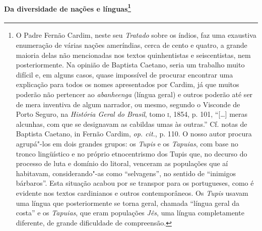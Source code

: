 \paragraph[Da diversidade de nações e línguas]{Da diversidade de nações e línguas\protect\footnote{ O
Padre Fernão Cardim, neste seu \textit{Tratado} sobre os índios, faz
uma exaustiva enumeração de várias nações ameríndias, cerca de cento e
quatro, a grande maioria delas não mencionadas nos textos quinhentistas
e seiscentistas, nem posteriormente. Na opinião de Baptista Caetano,
seria um trabalho muito difícil e, em alguns casos, quase impossível de
procurar encontrar uma explicação para todos os nomes apresentados por
Cardim, já que muitos poderão não pertencer ao \textit{abanheenga}
(língua geral) e outros poderão até ser de mera inventiva de algum
narrador, ou mesmo, segundo o Visconde de Porto Seguro, na
\textit{História Geral do Brasil}, tomo \textsc{i}, 1854, p. 101, ``[\ldots] meras
alcunhas, com que se designavam as cabildas umas às outras.'' Cf.
notas de Baptista Caetano, in Fernão Cardim, \textit{op. cit.}, p. 110.
O nosso autor procura agrupá"-los em dois grandes grupos: os
\textit{Tupis} e os \textit{Tapuias}, com base no tronco lingüístico e no
próprio etnocentrismo dos Tupis que, no decurso do processo de luta e
domínio do litoral, venceram as populações que aí habitavam,
considerando"-as como ``selvagens'', no sentido de ``inimigos bárbaros''. 
Esta situação acabou por se transpor para os portugueses, como é
evidente nos textos cardinianos e outros contemporâneos. Os
\textit{Tupis} usavam uma língua que posteriormente se torna geral,
chamada ``língua geral da costa'' e os \textit{Tapuias}, que eram
populações \textit{Jês}, uma língua completamente diferente, de grande
dificuldade de compreensão.}}

